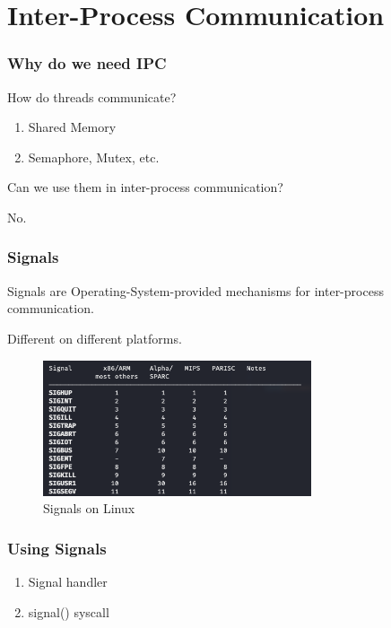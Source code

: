 \section{Inter-Process Communication}

\begin{frame}
    \frametitle{Why do we need IPC}

    How do threads communicate?
    \begin{enumerate}
        \item Shared Memory
        \item Semaphore, Mutex, etc.
    \end{enumerate}

    \vspace{2em}

    Can we use them in inter-process communication?

    No.

\end{frame}

\begin{frame}
    \frametitle{Signals}
    Signals are Operating-System-provided mechanisms for inter-process communication.

    Different on different platforms.

    \begin{figure}
        \centering
        \includegraphics[height = 4cm]{asset/signals.png}
        \caption{Signals on Linux}
    \end{figure}

\end{frame}


\begin{frame}
    \frametitle{Using Signals}

    \begin{enumerate}
        \item Signal handler
        \item signal() syscall
    \end{enumerate}

\end{frame}